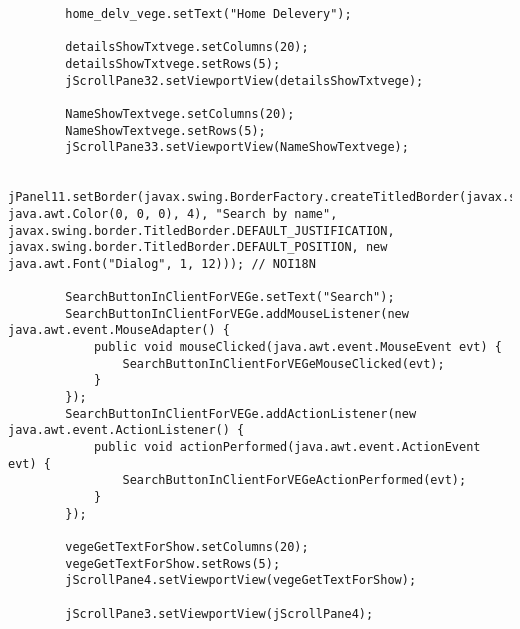 \documentclass[12pt,a4paper]{article}
\begin{document}
\begin{lstlisting}
        home_delv_vege.setText("Home Delevery");

        detailsShowTxtvege.setColumns(20);
        detailsShowTxtvege.setRows(5);
        jScrollPane32.setViewportView(detailsShowTxtvege);

        NameShowTextvege.setColumns(20);
        NameShowTextvege.setRows(5);
        jScrollPane33.setViewportView(NameShowTextvege);

        jPanel11.setBorder(javax.swing.BorderFactory.createTitledBorder(javax.swing.BorderFactory.createLineBorder(new java.awt.Color(0, 0, 0), 4), "Search by name", javax.swing.border.TitledBorder.DEFAULT_JUSTIFICATION, javax.swing.border.TitledBorder.DEFAULT_POSITION, new java.awt.Font("Dialog", 1, 12))); // NOI18N

        SearchButtonInClientForVEGe.setText("Search");
        SearchButtonInClientForVEGe.addMouseListener(new java.awt.event.MouseAdapter() {
            public void mouseClicked(java.awt.event.MouseEvent evt) {
                SearchButtonInClientForVEGeMouseClicked(evt);
            }
        });
        SearchButtonInClientForVEGe.addActionListener(new java.awt.event.ActionListener() {
            public void actionPerformed(java.awt.event.ActionEvent evt) {
                SearchButtonInClientForVEGeActionPerformed(evt);
            }
        });

        vegeGetTextForShow.setColumns(20);
        vegeGetTextForShow.setRows(5);
        jScrollPane4.setViewportView(vegeGetTextForShow);

        jScrollPane3.setViewportView(jScrollPane4);


\end{lstlisting}
\end{document}
